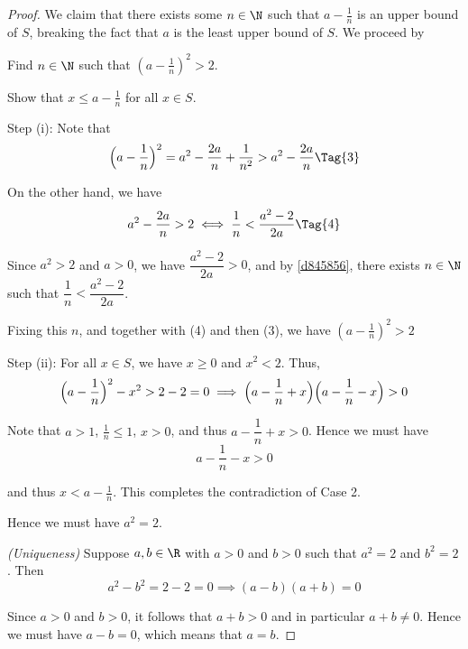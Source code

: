 \begin{proof}
  We claim that there exists some $n\in\N$ such that $a-\frac1n$ is an upper
  bound of $S$, breaking the fact that $a$ is the least upper bound of $S$. We
  proceed by
  \begin{enumerati}
    \item Find $n\in\N$ such that $(a-\frac1n)^2>2$.
    \item Show that $x\leq a-\frac1n$ for all $x\in S$.
  \end{enumerati}

  Step (i): Note that
  \begin{equation*}
    \Bigl(a-\frac1n\Bigr)^2=a^2-\frac{2a}n+\frac1{n^2}>a^2-\frac{2a}n\Tag{3}
  \end{equation*}

  On the other hand, we have
  \begin{equation*}
    a^2-\frac{2a}n>2\iff\frac1n<\frac{a^2-2}{2a}\Tag{4}
  \end{equation*}

  Since $a^2>2$ and $a>0$, we have $\dfrac{a^2-2}{2a}>0$, and by
  \autoref{d845856}, there exists $n\in\N$ such that
  $\dfrac1n<\dfrac{a^2-2}{2a}$.

  Fixing this $n$, and together with (4) and then (3), we have
  $(a-\frac1n)^2>2$

  Step (ii): For all $x\in S$, we have $x\geq0$ and $x^2<2$. Thus,
  \begin{equation*}
    \Bigl(a-\frac1n\Bigr)^2-x^2>2-2=0\implies\Bigl(a-\frac1n+x\Bigr)\Bigl(a-\frac1n-x\Bigr)>0
  \end{equation*}

  Note that $a>1$, $\frac1n\leq 1$, $x>0$, and thus $a-\dfrac1n+x>0$. Hence we
  must have
  $$
    a-\frac1n-x>0
  $$

  and thus $x<a-\frac1n$. This completes the contradiction of Case 2.

  Hence we must have $a^2=2$.

  \textit{(Uniqueness)} Suppose $a,b\in\R$ with $a>0$ and $b>0$ such that
  $a^2=2$ and $b^2=2$. Then
  \begin{equation*}
    a^2-b^2=2-2=0\implies(a-b)(a+b)=0
  \end{equation*}

  Since $a>0$ and $b>0$, it follows that $a+b>0$ and in particular $a+b\neq0$.
  Hence we must have $a-b=0$, which means that $a=b$.
\end{proof}

\label{c70a9ac}

